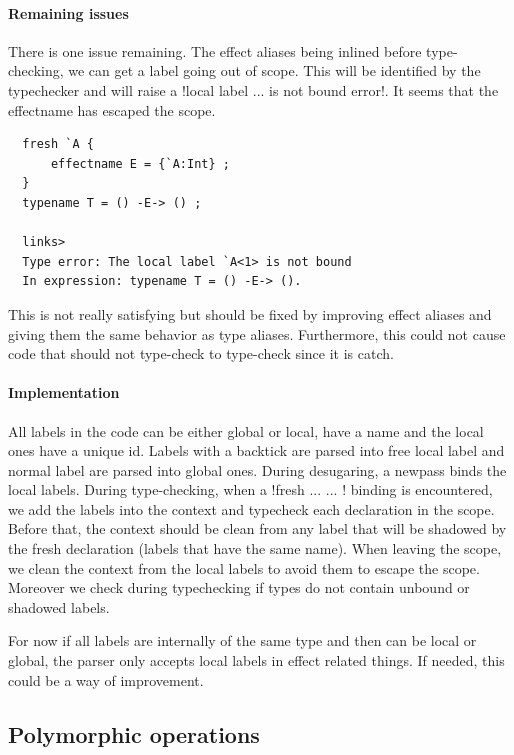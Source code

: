 \documentclass[11pt, nonacm=true, language=french, language=english]{acmart}
\begin{document}
\paragraph{Remaining issues}
There is one issue remaining. The effect aliases being inlined before type-checking, we can get a label going out of scope. This will be identified by the typechecker and will raise a !local label ... is not bound error!. It seems that the effectname has escaped the scope.
\begin{lstlisting}
  fresh `A {
      effectname E = {`A:Int} ;
  }
  typename T = () -E-> () ;

  links>
  Type error: The local label `A<1> is not bound
  In expression: typename T = () -E-> ().
\end{lstlisting}
This is not really satisfying but should be fixed by improving effect aliases and giving them the same behavior as type aliases. Furthermore, this could not cause code that should not type-check to type-check since it is catch.

\paragraph{Implementation}
All labels in the code can be either global or local, have a name and the local ones have a unique id. Labels with a backtick are parsed into free local label and normal label are parsed into global ones. During desugaring, a newpass binds the local labels. During type-checking, when a !fresh ... { ... }! binding is encountered, we add the labels into the context and typecheck each declaration in the scope. Before that, the context should be clean from any label that will be shadowed by the fresh declaration (labels that have the same name). When leaving the scope, we clean the context from the local labels to avoid them to escape the scope. Moreover we check during typechecking if types do not contain unbound or shadowed labels.

\begin{rem}
  For now if all labels are internally of the same type and then can be local or global, the parser only accepts local labels in effect related things. If needed, this could be a way of improvement.
\end{rem}


\subsection{Polymorphic operations}
\label{sec:poly-op}
\end{document}
